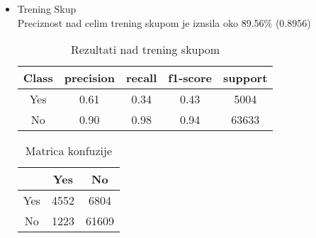 \documentclass[a4paper]{article}
\begin{document}
\begin{itemize}
    \item Trening Skup\\
        Preciznost nad celim trening skupom je iznsila oko 89.56\% (0.8956)
        \begin{table}[H]
        \begin{center}
        \caption{Rezultati nad trening skupom}
        \label{tab:DT-Trening}
        \begin{tabular}{|c|c|c|c|c|} \hline
        \textbf{Class} & \textbf{precision} & \textbf{recall}  & \textbf{f1-score} & \textbf{support} \\ \hline
        Yes & 0.61   &   0.34  &    0.43 &     5004 \\ \hline
         No & 0.90   &   0.98  &    0.94   &  63633\\ \hline
        \end{tabular}
        \end{center}
        \end{table}
        
        \begin{table}[H]
        \begin{center}
        \caption{Matrica konfuzije}
        \label{tab:DT-Trening-CM}
        \begin{tabular}{|c|c|c|} \hline
        \textbf{} & \textbf{Yes} & \textbf{No} \\ \hline
        Yes & 4552 & 6804  \\ \hline
        No &  1223 &61609 \\ \hline
        \end{tabular}
        \end{center}
        \end{table}
        

\end{itemize}
\end{document}
